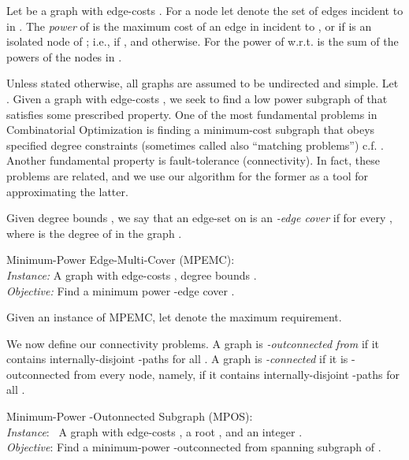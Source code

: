 \documentclass{llncs}
\begin{document}
\begin{definition}
Let  be a graph with edge-costs .
For a node  let  denote the set of edges incident to  in .
The {\em power}  of  is the maximum cost of an edge in  incident to , 
or  if  is an isolated node of ;
i.e.,  if ,
and  otherwise. For  the power of  w.r.t.  
is the sum  of the powers of the nodes in .
\end{definition}

Unless stated otherwise, all graphs are assumed to be undirected and simple.
Let . 
Given a graph  with edge-costs , 
we seek to find a low power subgraph  of  that satisfies some prescribed property.
One of the most fundamental problems in Combinatorial Optimization is finding 
a minimum-cost subgraph that obeys specified degree constraints 
(sometimes called also ``matching problems'') c.f. \cite{Sch}.
Another fundamental property is fault-tolerance (connectivity).
In fact, these problems are related, and we use our algorithm 
for the former as a tool for approximating the latter.

\begin{definition}
Given degree bounds , we say that an edge-set 
on  is an {\em -edge cover} if  for every ,
where  is the degree of  in the graph .
\end{definition}


\noindent
{\sf Minimum-Power Edge-Multi-Cover} ({\sf MPEMC}): \\
{\em Instance:} 
A graph  with edge-costs , 
degree bounds \hphantom{\em Instance: } 
. \\
{\em Objective:} 
Find a minimum power -edge cover .

\vspace{0.2cm}

Given an instance of {\sf MPEMC}, let  denote the maximum requirement.

We now define our connectivity problems. 
A  graph is {\em -outconnected from } if it contains 
internally-disjoint -paths for all .
A graph is {\em -connected} if it is -outconnected from every node, 
namely, if it contains  internally-disjoint -paths for all .

\vspace{0.2cm}

\noindent
{\sf Minimum-Power -Outonnected Subgraph} ({\sf MPOS}): \\
{\em Instance}: \ 
A graph  with edge-costs , a root , and 
\hphantom{\em Instance: } an integer . \\
{\em Objective}: 
Find a minimum-power -outconnected from  spanning subgraph  
\hphantom{\em Objective:} of .
\end{document}
